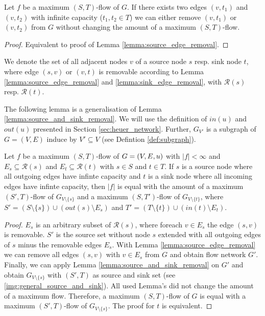 \begin{lemma}
\label{lemma:sink_edge_removal}
Let $f$ be a maximum $(S,T)$-flow of $G$. If there exists two edges $(v,t_1)$ and $(v,t_2)$
with infinite capacity ($t_1,t_2 \in T$) we can either remove $(v,t_1)$ or $(v,t_2)$ from $G$
without changing the amount of a maximum $(S,T)$-flow.
\end{lemma}

\begin{proof}
Equivalent to proof of Lemma \ref{lemma:source_edge_removal}.
\end{proof}

\begin{definition}
We denote the set of all adjacent nodes $v$ of a source node $s$ resp. sink node $t$, where
edge $(s,v)$ or $(v,t)$ is removable according to Lemma \ref{lemma:source_edge_removal}
and \ref{lemma:sink_edge_removal}, with $\mathcal{R}(s)$ resp. $\mathcal{R}(t)$.
\end{definition}

The following lemma is a generalisation of Lemma \ref{lemma:source_and_sink_removal}. We will use
the definition of $in(u)$ and $out(u)$ presented in Section \ref{sec:heuer_network}. Further,
$G_{V'}$ is a subgraph of $G = (V,E)$ induce by $V' \subseteq V$ (see Defintion \ref{def:subgraph}).

\begin{lemma}
\label{lemma:general_source_and_sink_removal}
Let $f$ be a maximum $(S,T)$-flow of $G = (V,E,u)$ with $|f| < \infty$ and
$E_s \subseteq \mathcal{R}(s)$ and $E_t \subseteq \mathcal{R}(t)$ with $s \in S$
and $t \in T$.
If $s$ is a source node where all outgoing edges have infinte capacity and
$t$ is a sink node where all incoming edges have infinte capacity, then
$|f|$ is equal with the amount of a maximum $(S',T)$-flow of $G_{V\setminus \{s\}}$ and a maximum
$(S,T')$-flow of $G_{V\setminus \{t\}}$, where $S' = (S\setminus \{s\}) \cup (out(s) \setminus E_s)$ 
and $T' = (T \setminus \{t\}) \cup (in(t) \setminus E_t)$.
\end{lemma}

\begin{proof}
$E_s$ is an arbitrary subset of $\mathcal{R}(s)$, where foreach $v \in E_s$ the edge $(s,v)$ is removable.
$S'$ is the source set without node $s$ extended with all outgoing edges of 
$s$ minus the removable edges $E_s$. With Lemma \ref{lemma:source_edge_removal}
we can remove all edges $(s,v)$ with $v \in E_s$ from $G$ and obtain flow network $G'$. Finally, we can
apply Lemma \ref{lemma:source_and_sink_removal} on $G'$ and obtain $G_{V\setminus \{s\}}$ with $(S',T)$ as source
and sink set (see \autoref{img:general_source_and_sink}). All used Lemma's did not change the amount of a maximum flow. Therefore, a maximum
$(S,T)$-flow of $G$ is equal with a maximum $(S',T)$-flow of $G_{V\setminus \{s\}}$. The proof for $t$ is
equivalent.
\end{proof}

